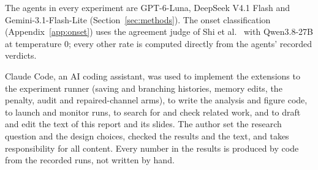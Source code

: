 \documentclass{article}
\begin{document}
The agents in every experiment are GPT-6-Luna, DeepSeek V4.1 Flash and Gemini-3.1-Flash-Lite (Section~\ref{sec:methods}). The onset classification (Appendix~\ref{app:onset}) uses the agreement judge of Shi et al.~\cite{shi2026} with Qwen3.8-27B at temperature 0; every other rate is computed directly from the agents' recorded verdicts.

Claude Code, an AI coding assistant, was used to implement the extensions to the experiment runner (saving and branching histories, memory edits, the penalty, audit and repaired-channel arms), to write the analysis and figure code, to launch and monitor runs, to search for and check related work, and to draft and edit the text of this report and its slides. The author set the research question and the design choices, checked the results and the text, and takes responsibility for all content. Every number in the results is produced by code from the recorded runs, not written by hand.
\end{document}
